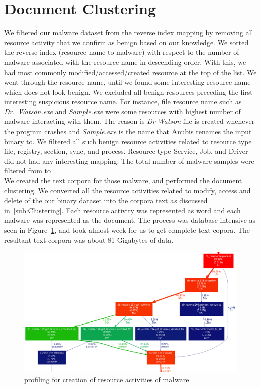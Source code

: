 \section{Document Clustering}
\label{sec:Document Clustering}
We filtered our malware dataset from the reverse index mapping by removing all resource activity that we confirm as benign based on our knowledge.
We sorted the reverse index (resource name to malware) with respect to the number of malware associated with the resource name in descending order.
With this, we had most commonly modified/accessed/created resource at the top of the list.
We went through the resource name, until we found some interesting resource name which does not look benign.
We excluded all benign resources preceding the first interesting suspicious resource name.
For instance, file resource name such as \emph{Dr.\ Watson.exe} and \emph{Sample.exe} were some resources with highest number of malware interacting with them.
The reason is \emph{Dr Watson} file is created whenever the program crashes and \emph{Sample.exe} is the name that Anubis renames the input binary to.
We filtered all such benign resource activities related to resource type file, registry, section, sync, and process.
Resource type Service, Job, and Driver did not had any interesting mapping.
The total number of malware samples were filtered from {\gettotalmalwareii{}} to {\gettotalmalwareiii{}}.\\

We created the text corpora for those {\gettotalmalwareiii{}} malware, and performed the document clustering.
We converted all the resource activities related to modify, access and delete of the our binary dataset into the corpora text as discussed in~\autoref{sub:Clustering}.
Each resource activity was represented as word and each malware was represented as the document.
The process was database intensive as seen in Figure~\ref{fig:actcreation}, and took almost week for us to get complete text copora.
The resultant text corpora was about 81 Gigabytes of data.
\begin{figure}
\begin{center}
  \includegraphics[scale=0.4]{figures/activities_creation.png}
\end{center}
\caption{profiling for creation of resource activities of malware}
\label{fig:actcreation}
\end{figure}
\\
